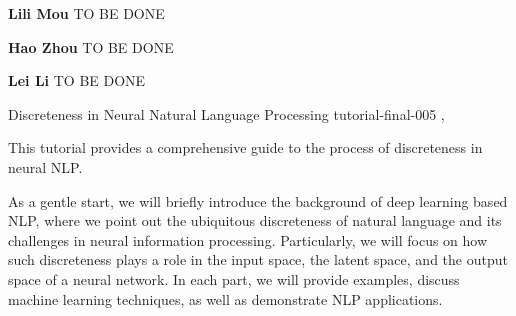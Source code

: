 \begin{bio}

\textbf{Lili Mou} TO BE DONE

\textbf{Hao Zhou} TO BE DONE

\textbf{Lei Li} TO BE DONE

\end{bio}

\begin{tutorial}
  {Discreteness in Neural Natural Language Processing}
  {tutorial-final-005}
  {\daydateyear, \tutorialmorningtime}
  {\TutLocE}

This tutorial provides a comprehensive guide to the process of discreteness in neural NLP.

As a gentle start, we will briefly introduce the background of deep learning based NLP, where we point out the ubiquitous discreteness of natural language and its challenges in neural information processing. Particularly, we will focus on how such discreteness plays a role in the input space, the latent space, and the output space of a neural network. In each part, we will provide examples, discuss machine learning techniques, as well as demonstrate NLP applications.

\end{tutorial}
